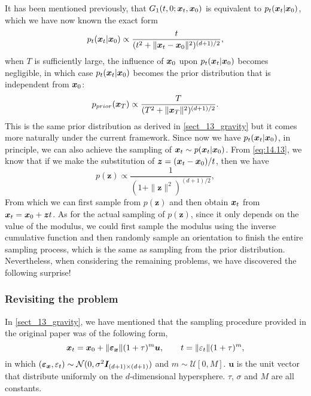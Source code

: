 It has been mentioned previously, that $G_1(t,0;\bm{x}_{t},\bm{x}_0)$ is equivalent to $p_t(\bm{x}_{t}|\bm{x}_0)$, which we have now known the exact form 
\begin{equation}
    \label{eq:14.15}
    p_t(\bm{x}_{t}|\bm{x}_0)\propto  \frac{t}{(t^2+\|\bm{x}_{t}-\bm{x}_0\|^2)^{(d+1)/2}},
\end{equation}
when $T$ is sufficiently large, the influence of $\bm{x}_0$ upon $p_t(\bm{x}_{t}|\bm{x}_0)$ becomes negligible, in which case $p_t(\bm{x}_{t}|\bm{x}_0)$ becomes the prior distribution that is independent from $\bm{x}_0$:
\begin{equation}
    \label{eq:14.16}
    p_{prior}(\bm{x}_T)\propto \frac{T}{(T^2+\|\bm{x}_T\|^2)^{(d+1)/2}}.
\end{equation}
This is the same prior distribution as derived in \cref{sect_13_gravity} but it comes more naturally under the current framework. Since now we have $p_t(\bm{x}_{t}|\bm{x}_0)$, in principle, we can also achieve the sampling of $\bm{x}_{t}\sim p(\bm{x}_{t} |\bm{x}_0)$. From \cref{eq:14.13}, we know that if we make the substitution of $\bm{z}=(\bm{x}_{t}-\bm{x}_0)/t$, then we have
\begin{equation}
    \label{eq:14.17}
    p(\bm{z})\propto \frac{1}{(1+\|\bm{z}\|^2)^{(d+1)/2}},
\end{equation}
From which we can first sample from $p(\bm{z})$ and then obtain $\bm{x}_{t}$ from $\bm{x}_{t}=\bm{x}_0+\bm{z}t$. As for the actual sampling of $p(\bm{z})$, since it only depends on the value of the modulus, we could first sample the modulus using the inverse cumulative function and then randomly sample an orientation to finish the entire sampling process, which is the same as sampling from the prior distribution. Nevertheless, when considering the remaining problems, we have discovered the following surprise!

\subsubsection{Revisiting the problem}
In \cref{sect_13_gravity}, we have mentioned that the sampling procedure provided in the original paper was of the following form,
\begin{equation}
\label{eq:14.18}
    \bm{x}_{t}=\bm{x}_0+\|\bm{\varepsilon}_{\bm{x}}\|(1+\tau)^{m}\bm{u},\qquad t=\|\varepsilon_t\|(1+\tau)^{m},
\end{equation}
in which $(\bm{\varepsilon}_{\bm{x}},\varepsilon_t)\sim\mathcal{N}(0,\sigma^2\bm{I}_{(d+1)\times(d+1)})$ and $m\sim\mathcal{U}[0,M]$. $\bm{u}$ is the unit vector that distribute uniformly on the $d$-dimensional hypersphere. $\tau$, $\sigma$ and $M$ are all constants. 

